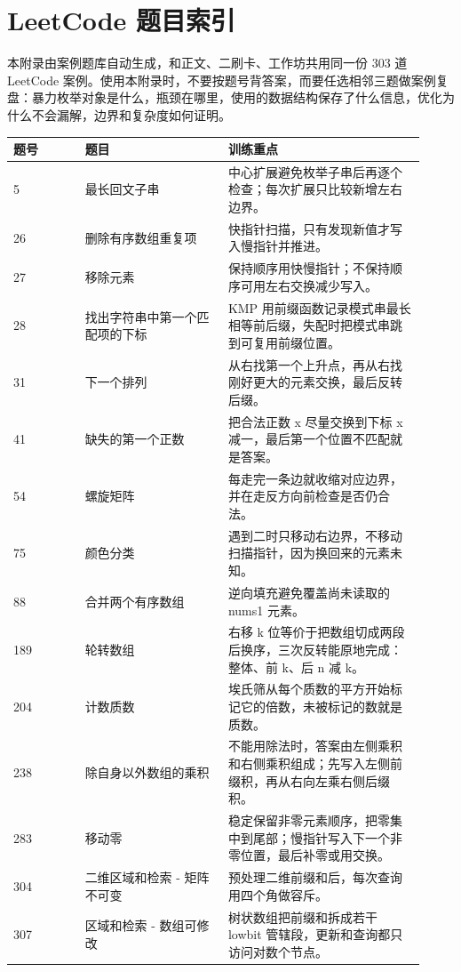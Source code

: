 \chapter{LeetCode 题目索引}

本附录由案例题库自动生成，和正文、二刷卡、工作坊共用同一份 303 道 LeetCode 案例。使用本附录时，不要按题号背答案，而要任选相邻三题做案例复盘：暴力枚举对象是什么，瓶颈在哪里，使用的数据结构保存了什么信息，优化为什么不会漏解，边界和复杂度如何证明。


\begin{longtable}{@{}p{0.16\linewidth}p{0.32\linewidth}p{0.44\linewidth}@{}}
\toprule
题号 & 题目 & 训练重点\\
\midrule
\endhead
5 & 最长回文子串 & 中心扩展避免枚举子串后再逐个检查；每次扩展只比较新增左右边界。\\
26 & 删除有序数组重复项 & 快指针扫描，只有发现新值才写入慢指针并推进。\\
27 & 移除元素 & 保持顺序用快慢指针；不保持顺序可用左右交换减少写入。\\
28 & 找出字符串中第一个匹配项的下标 & KMP 用前缀函数记录模式串最长相等前后缀，失配时把模式串跳到可复用前缀位置。\\
31 & 下一个排列 & 从右找第一个上升点，再从右找刚好更大的元素交换，最后反转后缀。\\
41 & 缺失的第一个正数 & 把合法正数 x 尽量交换到下标 x 减一，最后第一个位置不匹配就是答案。\\
54 & 螺旋矩阵 & 每走完一条边就收缩对应边界，并在走反方向前检查是否仍合法。\\
75 & 颜色分类 & 遇到二时只移动右边界，不移动扫描指针，因为换回来的元素未知。\\
88 & 合并两个有序数组 & 逆向填充避免覆盖尚未读取的 nums1 元素。\\
189 & 轮转数组 & 右移 k 位等价于把数组切成两段后换序，三次反转能原地完成：整体、前 k、后 n 减 k。\\
204 & 计数质数 & 埃氏筛从每个质数的平方开始标记它的倍数，未被标记的数就是质数。\\
238 & 除自身以外数组的乘积 & 不能用除法时，答案由左侧乘积和右侧乘积组成；先写入左侧前缀积，再从右向左乘右侧后缀积。\\
283 & 移动零 & 稳定保留非零元素顺序，把零集中到尾部；慢指针写入下一个非零位置，最后补零或用交换。\\
304 & 二维区域和检索 - 矩阵不可变 & 预处理二维前缀和后，每次查询用四个角做容斥。\\
307 & 区域和检索 - 数组可修改 & 树状数组把前缀和拆成若干 lowbit 管辖段，更新和查询都只访问对数个节点。\\

\end{longtable}
